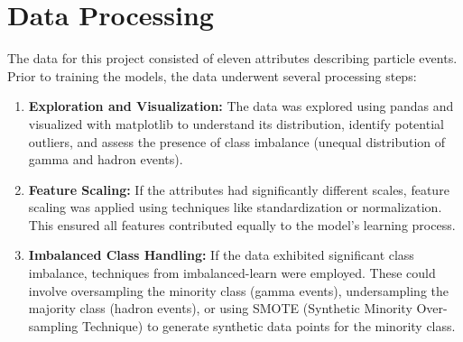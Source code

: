 \section{Data Processing}

The data for this project consisted of eleven attributes describing particle
events. Prior to training the models, the data underwent several processing
steps:

\begin{enumerate}
    \item \textbf{Exploration and Visualization:} The data was explored using
    pandas and visualized with matplotlib to understand its distribution,
    identify potential outliers, and assess the presence of class imbalance
    (unequal distribution of gamma and hadron events).
    \item \textbf{Feature Scaling:} If the attributes had significantly
    different scales, feature scaling was applied using techniques like
    standardization or normalization. This ensured all features contributed
    equally to the model's learning process.
    \item \textbf{Imbalanced Class Handling:} If the data exhibited significant
    class imbalance, techniques from imbalanced-learn were employed. These could
    involve oversampling the minority class (gamma events), undersampling the
    majority class (hadron events), or using SMOTE (Synthetic Minority
    Over-sampling Technique) to generate synthetic data points for the minority
    class.
\end{enumerate}
